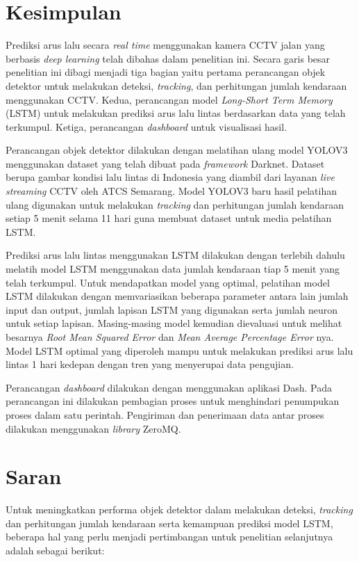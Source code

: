 \documentclass[../thesis.tex]{subfiles}
\begin{document}
\section{Kesimpulan}
Prediksi arus lalu secara \textit{real time} menggunakan kamera CCTV jalan yang berbasis \textit{deep learning} telah dibahas dalam penelitian ini. Secara garis besar penelitian ini dibagi menjadi tiga bagian yaitu
pertama perancangan objek detektor untuk melakukan deteksi, \textit{tracking}, dan perhitungan jumlah kendaraan menggunakan CCTV. Kedua, perancangan model \textit{Long-Short Term Memory} (LSTM) untuk melakukan prediksi arus lalu lintas berdasarkan data yang telah terkumpul. Ketiga, perancangan \textit{dashboard} untuk
visualisasi hasil.

Perancangan objek detektor dilakukan dengan melatihan ulang model YOLOV3 menggunakan dataset yang telah dibuat pada \textit{framework} Darknet. 
Dataset berupa gambar kondisi lalu lintas di Indonesia yang diambil dari layanan \textit{live streaming} CCTV oleh ATCS Semarang. Model YOLOV3 baru hasil pelatihan ulang digunakan untuk
melakukan \textit{tracking} dan perhitungan jumlah kendaraan setiap 5 menit selama 11 hari guna membuat dataset untuk media pelatihan LSTM.

Prediksi arus lalu lintas menggunakan LSTM dilakukan dengan terlebih dahulu melatih model LSTM menggunakan data jumlah kendaraan tiap 5 menit yang telah terkumpul. Untuk mendapatkan model yang optimal, pelatihan model LSTM dilakukan dengan 
memvariasikan beberapa parameter antara lain jumlah input dan output, jumlah lapisan LSTM yang digunakan serta jumlah neuron untuk setiap lapisan. Masing-masing model kemudian dievaluasi untuk melihat besarnya \textit{Root Mean Squared Error} dan 
\textit{Mean Average Percentage Error} nya. Model LSTM optimal yang diperoleh mampu untuk melakukan prediksi arus lalu lintas 1 hari kedepan dengan tren yang menyerupai data pengujian.

Perancangan \textit{dashboard} dilakukan dengan menggunakan aplikasi Dash. Pada perancangan ini dilakukan pembagian proses untuk menghindari penumpukan proses dalam satu perintah. Pengiriman dan penerimaan data antar proses dilakukan menggunakan \textit{library} ZeroMQ. 

\section{Saran}

Untuk meningkatkan performa objek detektor dalam melakukan deteksi, \textit{tracking} dan perhitungan jumlah kendaraan serta kemampuan prediksi model LSTM, beberapa hal yang perlu menjadi
pertimbangan untuk penelitian selanjutnya adalah sebagai berikut:
\end{document}
